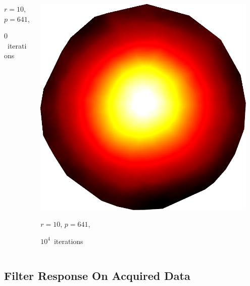 \documentclass[aspectratio=169,t]{beamer}
\begin{document}
{\begin{columns}
\begin{column}{0.22\textwidth}
			{\footnotesize 
				\par \vspace{-1mm} $r=10$, $p=641$,
				\par \vspace{-1mm} $0$~iterations
			}
		\end{column}
		\begin{column}{0.22\textwidth}
			\centering
			\includegraphics[width=.85\textwidth]{data/synthetic_meshes/random_circle_tessellation_Dirac_delta_10_v641_f1252_funcvals_10000iter.png}
			{\footnotesize 
				\par \vspace{-1mm} $r=10$, $p=641$,
				\par \vspace{-1mm} $10^4$~iterations
			}
		\end{column}
		\begin{column}{0.17\textwidth}~\end{column}
	\end{columns}
}
\iffalse


\subsection{Filter Response On Acquired Data}

\end{document}
